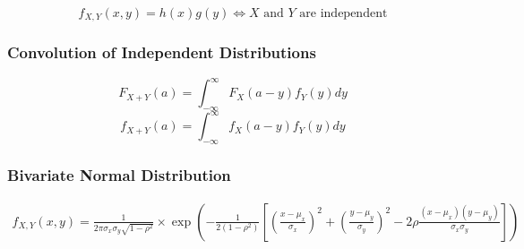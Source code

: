 \documentclass{article}
\begin{document}
\begin{multicols}{2}
\begin{equation*}
 f_{X,Y}(x,y) = h(x)g(y) \Leftrightarrow X \text{ and } Y \text{ are independent}
\end{equation*}
\subsubsection*{Convolution of Independent Distributions}
$$F_{X+Y}(a) = \int_{-\infty}^{\infty}F_X(a-y)f_Y(y)dy$$
$$f_{X+Y}(a) = \int_{-\infty}^{\infty}f_X(a-y)f_Y(y)dy$$






\end{multicols}
\subsubsection*{Bivariate Normal Distribution}
\begin{equation*}
\begin{split}
f_{X,Y}(x,y) = \frac{1}{2\pi\sigma_x\sigma_y\sqrt{1-\rho^2}} \times \exp{\left(-\frac{1}{2(1-\rho^2)}\left[\left(\frac{x-\mu_x}{\sigma_x}\right)^2 + \left(\frac{y-\mu_y}{\sigma_y}\right)^2 - 2\rho\frac{(x-\mu_x)(y-\mu_y)}{\sigma_x\sigma_y}\right]\right)}
\end{split} 
\end{equation*}
\end{document}
